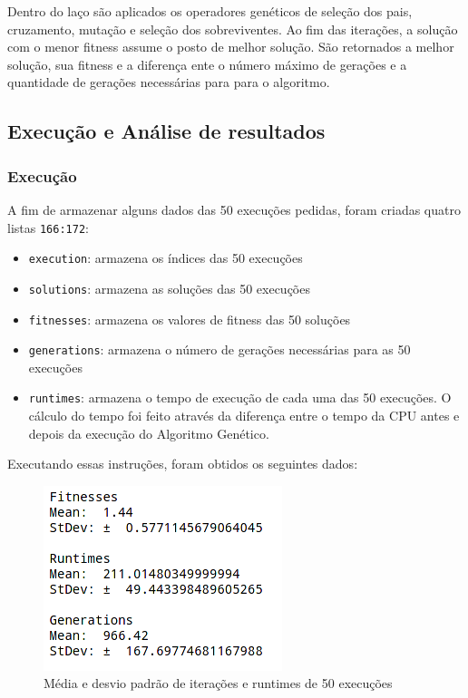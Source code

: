 Dentro do laço são aplicados os operadores genéticos de seleção dos pais, cruzamento, mutação e seleção dos sobreviventes. Ao fim das iterações, a solução com o menor fitness assume o posto de melhor solução. São retornados a melhor solução, sua fitness e a diferença ente o número máximo de gerações e a quantidade de gerações necessárias para para o algoritmo.



\subsection{Execução e Análise de resultados}

\subsubsection{Execução}

A fim de armazenar alguns dados das 50 execuções pedidas, foram criadas quatro listas \verb*|166:172|:
\begin{itemize}
	\item \verb*|execution|: armazena os índices das 50 execuções
	\item \verb*|solutions|: armazena as soluções das 50 execuções
	\item \verb*|fitnesses|: armazena os valores de fitness das 50 soluções
	\item \verb*|generations|: armazena o número de gerações necessárias para as 50 execuções
	\item \verb*|runtimes|: armazena o tempo de execução de cada uma das 50 execuções. O cálculo do tempo foi feito através da diferença entre o tempo da CPU antes e depois da execução do Algoritmo Genético.
\end{itemize}



Executando essas instruções, foram obtidos os seguintes dados:

\begin{figure}[H]
	\centering
	\includegraphics[scale=.7]{img/stats_ag}
	\caption{Média e desvio padrão de iterações e runtimes de 50 execuções}
	\label{statsag}
\end{figure}


